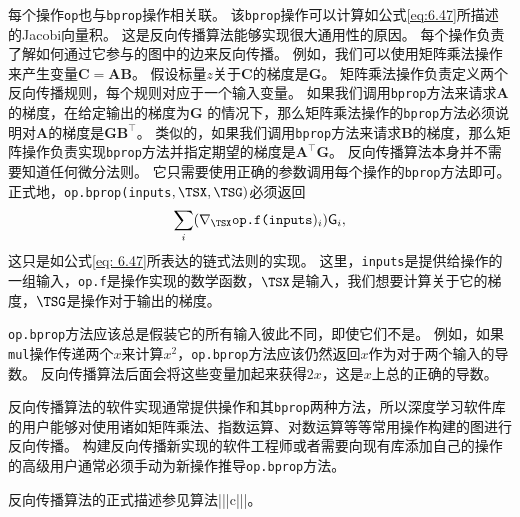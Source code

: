   
每个操作\verb|op|也与\verb|bprop|操作相关联。
该\verb|bprop|操作可以计算如公式\ref{eq:6.47}所描述的Jacobi向量积。
这是反向传播算法能够实现很大通用性的原因。
每个操作负责了解如何通过它参与的图中的边来反向传播。
例如，我们可以使用矩阵乘法操作来产生变量$\bm{C}=\bm{A}\bm{B}$。
假设标量$z$关于$\bm{C}$的梯度是$\bm{G}$。
矩阵乘法操作负责定义两个反向传播规则，每个规则对应于一个输入变量。
如果我们调用\verb|bprop|方法来请求$\bm{A}$的梯度，在给定输出的梯度为$\bm{G}$ 的情况下，那么矩阵乘法操作的\verb|bprop|方法必须说明对$\bm{A}$的梯度是$\bm{G}\bm{B}^\top$。
类似的，如果我们调用\verb|bprop|方法来请求$\bm{B}$的梯度，那么矩阵操作负责实现\verb|bprop|方法并指定期望的梯度是$\bm{A}^\top\bm{G}$。
反向传播算法本身并不需要知道任何微分法则。
它只需要使用正确的参数调用每个操作的\verb|bprop|方法即可。
正式地，\verb|op.bprop(inputs|$, \TSX, \TSG)$必须返回
\begin{equation}
  \sum_i (\nabla_{\TSX} \verb|op.f(inputs|)_i) \textsf{G}_i,
\end{equation}
这只是如公式\ref{eq: 6.47}所表达的链式法则的实现。
这里，\verb|inputs|是提供给操作的一组输入，\verb|op.f|是操作实现的数学函数，$\TSX$是输入，我们想要计算关于它的梯度，$\TSG$是操作对于输出的梯度。

\verb|op.bprop|方法应该总是假装它的所有输入彼此不同，即使它们不是。
例如，如果\verb|mul|操作传递两个$x$来计算$x^2$，\verb|op.bprop|方法应该仍然返回$x$作为对于两个输入的导数。
反向传播算法后面会将这些变量加起来获得$2x$，这是$x$上总的正确的导数。

反向传播算法的软件实现通常提供操作和其\verb|bprop|两种方法，所以深度学习软件库的用户能够对使用诸如矩阵乘法、指数运算、对数运算等等常用操作构建的图进行反向传播。
构建反向传播新实现的软件工程师或者需要向现有库添加自己的操作的高级用户通常必须手动为新操作推导\verb|op.bprop|方法。

反向传播算法的正式描述参见算法|||c|||。

  
  
